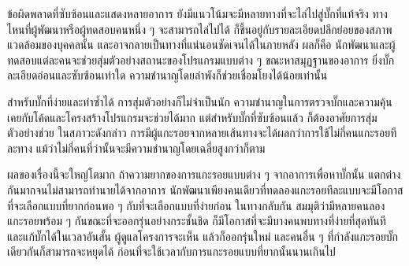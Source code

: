ข้อผิดพลาดที่ซับซ้อนและแสดงหลายอาการ
ยังมีแนวโน้มจะมีหลายทางที่จะไล่ไปสู่บั๊กที่แท้จริง
ทางไหนที่ผู้พัฒนาหรือผู้ทดสอบคนหนึ่ง ๆ  จะสามารถไล่ไปได้
ก็ขึ้นอยู่กับรายละเอียดปลีกย่อยของสภาพแวดล้อมของบุคคลนั้น
และอาจกลายเป็นทางที่แน่นอนชัดเจนได้ในภายหลัง ผลก็คือ
นักพัฒนาและผู้ทดสอบแต่ละคนจะช่วยสุ่มตัวอย่างสถานะของโปรแกรมแบบต่าง ๆ
ขณะหาสมุฏฐานของอาการ ยิ่งบั๊กละเอียดอ่อนและซับซ้อนเท่าใด
ความชำนาญโดยลำพังก็ช่วยเชื่อมโยงได้น้อยเท่านั้น

สำหรับบั๊กที่ง่ายและทำซ้ำได้ การสุ่มตัวอย่างก็ไม่จำเป็นนัก
ความชำนาญในการตรวจบั๊กและความคุ้นเคยกับโค้ดและโครงสร้างโปรแกรมจะช่วยได้มาก
แต่สำหรับบั๊กที่ซับซ้อนแล้ว ก็ต้องอาศัยการสุ่มตัวอย่างช่วย
ในสภาวะดังกล่าว
การมีผู้แกะรอยจากหลายเส้นทางจะได้ผลกว่าการใช้ไม่กี่คนแกะรอยทีละทาง
แม้ว่าไม่กี่คนที่ว่านั้นจะมีความชำนาญโดยเฉลี่ยสูงกว่าก็ตาม

ผลของเรื่องนี้จะใหญ่โตมาก ถ้าความยากของการแกะรอยแบบต่าง ๆ
จากอาการเพื่อหาบั๊กนั้น แตกต่างกันมากจนไม่สามารถทำนายได้จากอาการ
นักพัฒนาเพียงคนเดียวที่ทดลองแกะรอยทีละแบบจะมีโอกาสที่จะเลือกแบบที่ยากก่อนพอ ๆ
กับที่จะเลือกแบบที่ง่ายก่อน ในทางกลับกัน
สมมุติว่ามีหลายคนลองแกะรอยพร้อม ๆ  กันขณะที่จะออกรุ่นอย่างกระชั้นชิด
ก็มีโอกาสที่จะมีบางคนพบทางที่ง่ายที่สุดทันที และแก้บั๊กได้ในเวลาอันสั้น
ผู้ดูแลโครงการจะเห็น แล้วก็ออกรุ่นใหม่ และคนอื่น ๆ
ที่กำลังแกะรอยบั๊กเดียวกันก็สามารถจะหยุดได้
ก่อนที่จะใช้เวลากับการแกะรอยแบบที่ยากนั้นนานเกินไป 